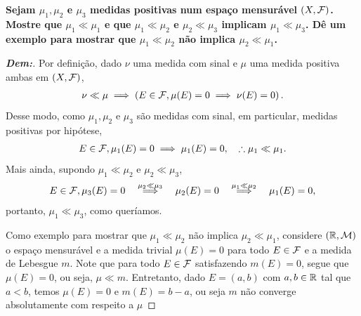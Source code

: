 \textbf{Sejam $\mu_1, \mu_2$ e $\mu_3$ medidas positivas num espaço mensurável $(X, \mathcal F)$. 
Mostre que $\mu_1 \ll \mu_1$ e que $\mu_1 \ll \mu_2$ e $\mu_2 \ll \mu_3$
implicam $\mu_1 \ll \mu_3$. Dê um exemplo para mostrar que $\mu_1 \ll \mu_2$ 
não implica $\mu_2 \ll \mu_1$.}
\begin{proof}[\textbf{Dem:}] Por definição, dado $\nu$ uma medida com sinal 
  e $\mu$ uma medida positiva ambas em $(X,\mathcal F)$, 
  \begin{align*}
    \nu \ll \mu \implies \left(E\in \mathcal F, \mu(E) = 0 \implies \nu(E) = 0\right). 
  \end{align*}
  Desse modo, como $\mu_1, \mu_2$ e $\mu_3$ são medidas com sinal, em particular, 
  medidas positivas por hipótese, 
  \begin{align*}
    E\in \mathcal F, \mu_1(E) = 0 \implies \mu_1(E) = 0,\quad \therefore \mu_1 \ll \mu_1.
  \end{align*}
  Mais ainda, supondo $\mu_1 \ll \mu_2$ e $\mu_2 \ll \mu_3$, 
  \begin{align*}
    E\in \mathcal F, \mu_3(E) =0 \quad\overset{\mu_2 \ll \mu_3}{\implies}\quad \mu_2(E) = 0 
    \quad\overset{\mu_1 \ll \mu_2}{\implies}\quad \mu_1(E) = 0,
  \end{align*}
  portanto, $\mu_1 \ll \mu_3$, como queríamos.

  Como exemplo para mostrar que $\mu_1 \ll \mu_2 $ não implica $\mu_2 \ll \mu_1$,
  considere $(\mathbb R, \mathcal M)$ o espaço mensurável e a medida trivial $\mu(E) = 0$ 
  para todo $E \in \mathcal F$ e a medida de Lebesgue $m$. Note que para todo 
  $E \in \mathcal F$ satisfazendo $m(E) = 0$, segue que $\mu(E) = 0$, ou seja, 
  $\mu \ll m$. Entretanto, dado $E = (a, b)$ com $a, b \in \mathbb R$ tal que $a < b$,
  temos $\mu(E) = 0$ e $m(E) = b - a$, ou seja $m$ não converge absolutamente 
  com respeito a $\mu$
\end{proof}

